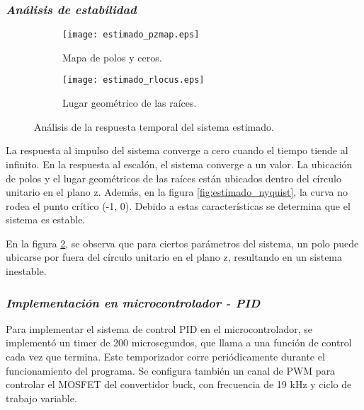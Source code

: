 \subsubsection*{\it{Análisis de estabilidad}}
\vspace{-0.5cm}

\begin{figure}[H]
    \centering

    \begin{subfigure}[b]{0.49\textwidth}
        \centering
        \texttt{[image: estimado\_pzmap.eps]}
        \caption{Mapa de polos y ceros.}
        \label{fig:estimado_pzmap}
    \end{subfigure}
    \begin{subfigure}[b]{0.49\textwidth}
        \centering
        \texttt{[image: estimado\_rlocus.eps]}
        \caption{Lugar geométrico de las raíces.}
        \label{fig:estimado_rlocus}
    \end{subfigure}

    \vspace{-0.25cm}
    \caption{Análisis de la respuesta temporal del sistema estimado.}
    \label{fig:estimado_estabilidad}
\end{figure}
\vspace{-0.5cm}

La respuesta al impulso del sistema converge a cero cuando el tiempo tiende al infinito.
En la respuesta al escalón, el sistema converge a un valor.
La ubicación de polos y el lugar geométricos de las raíces están ubicados dentro 
del círculo unitario en el plano z. Además, en la figura \ref{fig:estimado_nyquist}, la curva no rodea
el punto crítico (-1, 0). Debido a estas características se determina que el sistema es estable.

En la figura \ref{fig:estimado_rlocus}, se observa que para ciertos parámetros del sistema, un polo puede
ubicarse por fuera del círculo unitario en el plano z, resultando en un sistema inestable.

\subsubsection*{\it{Implementación en microcontrolador - PID}}
\vspace{-0.25cm}

Para implementar el sistema de control PID en el microcontrolador, se implementó un timer de 200 microsegundos,
que llama a una función de control cada vez que termina. Este temporizador corre periódicamente durante el funcionamiento
del programa. Se configura también un canal de PWM para controlar el MOSFET del convertidor buck, con frecuencia de 19 kHz
y ciclo de trabajo variable.

